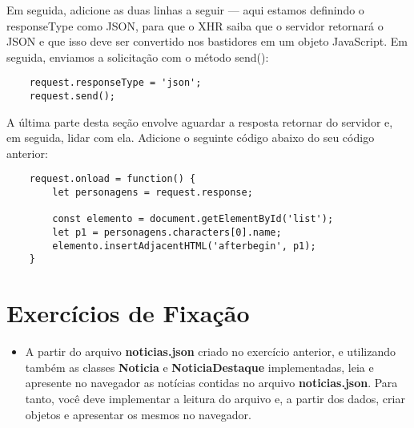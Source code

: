 Em seguida, adicione as duas linhas a seguir — aqui estamos definindo o  responseType como JSON, para que o XHR saiba que o servidor retornará o JSON e que isso deve ser convertido nos bastidores em um objeto JavaScript. Em seguida, enviamos a solicitação com o método send():

\begin{lstlisting}
	request.responseType = 'json';
	request.send();
\end{lstlisting}

A última parte desta seção envolve aguardar a resposta retornar do servidor e, em seguida, lidar com ela. Adicione o seguinte código abaixo do seu código anterior:

\begin{lstlisting}
	request.onload = function() {
		let personagens = request.response;
		
		const elemento = document.getElementById('list');
		let p1 = personagens.characters[0].name;
		elemento.insertAdjacentHTML('afterbegin', p1);
	}
\end{lstlisting}

\section{Exercícios de Fixação}

\begin{itemize}
	\item A partir do arquivo \textbf{noticias.json} criado no exercício anterior, e utilizando também as classes \textbf{Noticia} e \textbf{NoticiaDestaque} implementadas, leia e apresente no navegador as notícias contidas no arquivo \textbf{noticias.json}. Para tanto, você deve implementar a leitura do arquivo e, a partir dos dados, criar objetos e apresentar os mesmos no navegador.
\end{itemize}